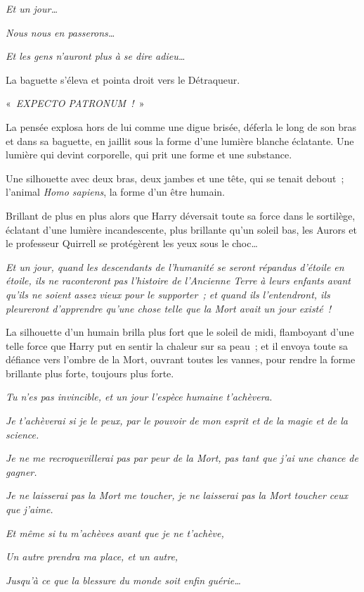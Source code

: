 \emph{Et un jour…}

\emph{Nous nous en passerons…}

\emph{Et les gens n'auront plus à se dire adieu…}

La baguette s'éleva et pointa droit vers le Détraqueur.

«~\emph{EXPECTO PATRONUM~!}~»

La pensée explosa hors de lui comme une digue brisée, déferla le long de son bras et dans sa baguette, en jaillit sous la forme d'une lumière blanche éclatante.
Une lumière qui devint corporelle, qui prit une forme et une substance.

Une silhouette avec deux bras, deux jambes et une tête, qui se tenait debout~; l'animal \emph{Homo sapiens}, la forme d'un être humain.

Brillant de plus en plus alors que Harry déversait toute sa force dans le sortilège, éclatant d'une lumière incandescente, plus brillante qu'un soleil bas, les Aurors et le professeur Quirrell se protégèrent les yeux sous le choc…

\emph{Et un jour, quand les descendants de l'humanité se seront répandus d'étoile en étoile, ils ne raconteront pas l'histoire de l'Ancienne Terre à leurs enfants avant qu'ils ne soient assez vieux pour le supporter~; et quand ils l'entendront, ils pleureront d'apprendre qu'une chose telle que la Mort avait un jour existé~!}

La silhouette d'un humain brilla plus fort que le soleil de midi, flamboyant d'une telle force que Harry put en sentir la chaleur sur sa peau~; et il envoya toute sa défiance vers l'ombre de la Mort, ouvrant toutes les vannes, pour rendre la forme brillante plus forte, toujours plus forte.

\emph{Tu n'es pas invincible, et un jour l'espèce humaine t'achèvera.}

\emph{Je t'achèverai si je le peux, par le pouvoir de mon esprit et de la magie et de la science.}

\emph{Je ne me recroquevillerai pas par peur de la Mort, pas tant que j'ai une chance de gagner.}

\emph{Je ne laisserai pas la Mort me toucher, je ne laisserai pas la Mort toucher ceux que j'aime.}

\emph{Et même si tu m'achèves avant que je ne t'achève,}

\emph{Un autre prendra ma place, et un autre,}

\emph{Jusqu'à ce que la blessure du monde soit enfin guérie…}

